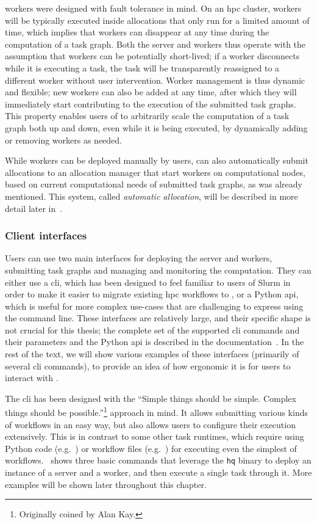 \hyperqueue{} workers were designed with fault tolerance in mind. On an
\gls{hpc}
cluster, workers will be typically executed inside allocations that only run for a limited amount
of time, which implies that workers can disappear at any time during the computation of a task
graph. Both the server and workers thus operate with the assumption that workers can be potentially
short-lived; if a worker disconnects while it is executing a task, the task will be transparently
reassigned to a different worker without user intervention. Worker management is thus dynamic and
flexible; new workers can also be added at any time, after which they will immediately start
contributing to the execution of the submitted task graphs. This property enables users of
\hq{} to arbitrarily scale the computation of a task graph both up and down, even
while it is being executed, by dynamically adding or removing workers as needed.

While workers can be deployed manually by users, \hq{} can also automatically
submit allocations to an allocation manager that start workers on computational nodes, based on
current computational needs of submitted task graphs, as was already mentioned. This system, called
\emph{automatic allocation}, will be described in more detail later in~.

\subsubsection*{Client interfaces}
Users can use two main interfaces for deploying the \hyperqueue{} server and workers,
submitting task graphs and managing and monitoring the computation. They can either use a
\gls{cli}, which has been designed to feel familiar to users of Slurm in order to
make it easier to migrate existing \gls{hpc} workflows to \hyperqueue{}, or
a Python \gls{api}, which is useful for more complex use-cases that are challenging
to express using the command line. These interfaces are relatively large, and their specific shape
is not crucial for this thesis; the complete set of the supported \gls{cli} commands
and their parameters and the Python \gls{api} is described in the
\hyperqueue{} documentation~\cite{hq_docs}. In the rest of the text, we will
show various examples of these interfaces (primarily of several \gls{cli} commands),
to provide an idea of how ergonomic it is for users to interact with \hyperqueue{}.

The \gls{cli} has been designed with the ``Simple things should be simple. Complex
things should be possible.''\footnote{Originally coined by Alan Kay.} approach in mind. It allows submitting various
kinds of workflows in an easy way, but also allows users to configure their execution extensively.
This is in contrast to some other task runtimes, which require using Python code (e.g.\
\dask{}) or workflow files (e.g.\ \snakemake{}) for executing even the
simplest of workflows.~\Autoref{lst:hq-cli-commands} shows three basic commands that leverage the
\texttt{hq} binary to deploy an instance of a \hyperqueue{} server and a
worker, and then execute a single task through it. More examples will be shown later throughout
this chapter.

